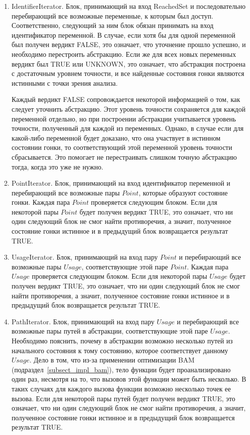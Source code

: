 \begin{enumerate}

\item IdentifierIterator. Блок, принимающий на вход ReachedSet и последовательно перебирающий все возможные переменные, к которым был доступ.
Соответственно, следующий за ним блок обязан принимать на вход идентификатор переменной.
В случае, если хотя бы для одной переменной был получен вердикт FALSE, это означает, что уточнение прошло успешно, и необходимо перестроить абстракцию.
Если же для всех новых переменных вердикт был TRUE или UNKNOWN, это означает, что абстракция построена с достаточным уровнем точности, и все найденные состояния гонки являются истинными с точки зрения анализа.

Каждый вердикт FALSE сопровождается некоторой информацией о том, как следует уточнить абстракцию. Этот уровень точности сохраняется для каждой переменной отдельно, но при построении абстракции учитывается уровень точности, полученный для каждой из переменных. Однако, в случае если для  какой-либо переменной будет доказано, что она участвует в истинном состоянии гонки, то соответствующий этой переменной уровень точности сбрасывается. Это помогает не перестраивать слишком точную абстракцию тогда, когда это уже не нужно.

\item PointIterator. Блок, принимающий на вход идентификатор переменной и перебирающий все возможные пары $Point$, которые образуют состояние гонки. Каждая пара $Point$ проверяется следующим блоком. Если для некоторой пары $Point$ будет получен вердикт TRUE, это означает, что ни один следующий блок не смог найти противоречия, а значит, полученное состояние гонки истинное и в предыдущий блок возвращается результат TRUE. 

\item UsageIterator. Блок, принимающий на вход пару $Point$ и перебирающий все возможные пары $Usage$, соответствующие этой паре $Point$. Каждая пара $Usage$ проверяется следующим блоком. Если для некоторой пары $Usage$ будет получен вердикт TRUE, это означает, что ни один следующий блок не смог найти противоречия, а значит, полученное состояние гонки истинное и в предыдущий блок возвращается результат TRUE. 

\item PathIterator. Блок, принимающий на вход пару $Usage$ и перебирающий все возможные пары путей в абстракции, соответствующие этой паре $Usage$. Необходимо пояснить, почему в абстракции возможно несколько путей из начального состояния к тому состоянию, которое соответствует данному $Usage$. Дело в том, что из-за применении оптимизации BAM (подраздел~\ref{subsect_impl_bam}), тело функции будет проанализировано один раз, несмотря на то, что вызовов этой функции может быть несколько. В таких случаях для каждого вызова функции возможно несколько точек ее вызова. Если для некоторой пары путей будет получен вердикт TRUE, это означает, что ни один следующий блок не смог найти противоречия, а значит, полученное состояние гонки истинное и в предыдущий блок возвращается результат TRUE. 

\end{enumerate}

